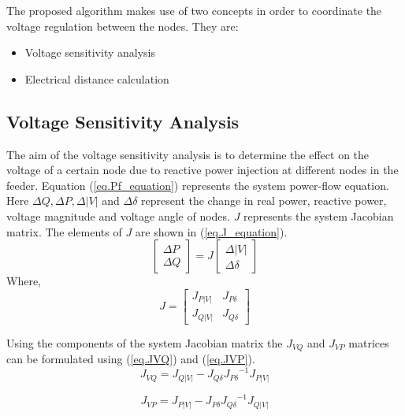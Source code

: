 The proposed algorithm makes use of two concepts in order to coordinate the voltage regulation between the nodes. They are:
\begin{itemize}
\item Voltage sensitivity analysis
\item Electrical distance calculation
\end{itemize}
\subsection{Voltage Sensitivity Analysis}
The aim of the voltage sensitivity analysis is to determine the effect on the voltage of a certain node due to reactive power injection at different nodes in the feeder. Equation (\ref{eq.Pf_equation}) represents the system power-flow equation.  Here ${\Delta Q}, {\Delta P}, {\Delta |V|}$ and ${\Delta \delta}$ represent the change in real power, reactive power, voltage magnitude and voltage angle of nodes. $J$ represents the system Jacobian matrix. The elements of $J$ are shown in (\ref{eq.J_equation}).
\begin{equation}\label{eq.Pf_equation}
\begin{bmatrix}
{\Delta P}\\ {\Delta Q}
\end{bmatrix} =J\begin{bmatrix}
{\Delta|V|} \\ {\Delta\delta}
\end{bmatrix}
\end{equation}  
Where,
\begin{equation}\label{eq.J_equation}
    J = \begin{bmatrix}
{J_{P|V|}} & {J_{P\delta}}\\ {J_{Q|V|}} & {J_{Q\delta}}
\end{bmatrix}
\end{equation}

Using the components of the system Jacobian matrix the $J_{VQ}$ and $J_{VP}$ matrices can be formulated using (\ref{eq.JVQ}) and (\ref{eq.JVP}).
\begin{equation}\label{eq.JVQ}
    {J_{VQ}} = {J_{Q|V|}}-{J_{Q\delta}}{J_{P\delta}}^{-1}{J_{P|V|}}
\end{equation}

\begin{equation}\label{eq.JVP}
    {J_{VP}}={J_{P|V|}}-{J_{P\delta}}{J_{Q\delta}}^{-1}{J_{Q|V|}}
\end{equation}

